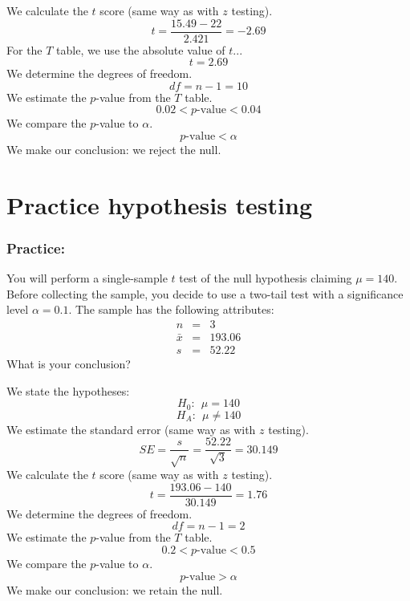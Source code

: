 \documentclass[slidestop,compress,mathserif]{beamer}
\newcommand{\solnGr}[1]{#1}
\begin{document}
\begin{frame}
 We calculate the \(t\) score (same way as with \(z\) testing). \pause
\[t = \frac{15.49-22}{2.421} = -2.69 \] \pause 
For the $T$ table, we use the absolute value of $t$...
$$t = 2.69 $$
We determine the degrees of freedom. 
\[df = n-1 = 10 \] \pause We estimate the \(p\)-value from the \(T\)
table. \pause \[0.02 < p\text{-value} < 0.04 \] \pause We compare the \(p\)-value to \(\alpha\). \pause \[p\text{-value} < \alpha \] \pause We make our conclusion: we
reject the null.
\end{frame}


\section{Practice hypothesis testing}

\begin{frame}
\frametitle{Practice:}
You will perform a single-sample \(t\) test of the null hypothesis
claiming \(\mu=140\). Before collecting the sample, you decide to use a
two-tail test with a significance level \(\alpha = 0.1\). The sample has
the following attributes: \[\begin{aligned}
n &=& 3 \\
\bar{x} &=& 193.06 \\
s &=& 52.22
\end{aligned}\] What is your conclusion?


\end{frame}

\solnGr{
\begin{frame}
\footnotesize
We state the hypotheses: \pause \[H_0:~~\mu = 140 \] \[H_A:~~\mu \ne 140 \] \pause We
estimate the standard error (same way as with \(z\) testing).\pause 
\[SE = \frac{s}{\sqrt{n}} =  \frac{52.22}{\sqrt{3}} = 30.149\] \pause We
calculate the \(t\) score (same way as with \(z\) testing).\pause 
\[t = \frac{193.06-140}{30.149} = 1.76 \] \pause We determine the degrees of
freedom. \pause \[df = n-1 = 2 \] \pause  We estimate the \(p\)-value from the \(T\)
table. \pause  \[0.2 < p\text{-value} < 0.5 \] \pause  We compare the \(p\)-value to
\(\alpha\). \pause  \[p\text{-value} > \alpha \] \pause  We make our conclusion: \pause  we
retain the null.
\end{frame}
}
\end{document}
